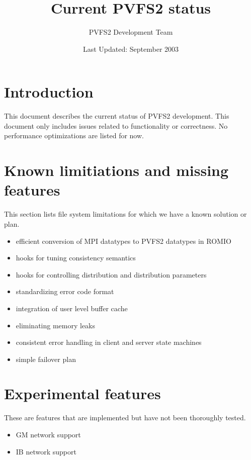 \documentclass[11pt, letterpaper]{article}
\title{Current PVFS2 status}
\author{ PVFS2 Development Team }
\date{ Last Updated: September 2003 }
\begin{document}
\maketitle

\tableofcontents

\newpage

\thispagestyle{empty}

\setlength{\parindent}{0.0cm}

\section{Introduction}

This document describes the current status of PVFS2 development.  This document
only includes issues related to functionality or correctness.  No 
performance optimizations are listed for now.

\section{Known limitiations and missing features}

This section lists file system limitations for which we have a known
solution or plan.

\begin{itemize}
\item efficient conversion of MPI datatypes to PVFS2 datatypes in ROMIO
\item hooks for tuning consistency semantics
\item hooks for controlling distribution and distribution parameters
\item standardizing error code format
\item integration of user level buffer cache
\item eliminating memory leaks
\item consistent error handling in client and server state machines
\item simple failover plan
\end{itemize}

\section{Experimental features}

These are features that are implemented but have not been thoroughly tested.

\begin{itemize}
\item GM network support
\item IB network support
\end{itemize}
\end{document}
